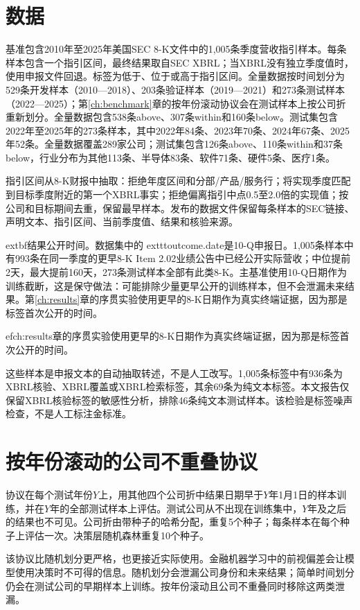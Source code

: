 \documentclass[12pt,openany]{ctexbook}
\begin{document}
\section{数据}
基准包含2010年至2025年美国SEC 8-K文件中的1,005条季度营收指引样本。每条样本包含一个指引区间，最终结果取自SEC XBRL；当XBRL没有独立季度值时，使用申报文件回退。标签为低于、位于或高于指引区间。全量数据按时间划分为529条开发样本（2010—2018）、203条验证样本（2019—2021）和273条测试样本（2022—2025）；第\ref{ch:benchmark}章的按年份滚动协议会在测试样本上按公司折重新划分。全量数据包含538条above、307条within和160条below。测试集包含2022年至2025年的273条样本，其中2022年84条、2023年70条、2024年67条、2025年52条。全量数据覆盖289家公司；测试集包含126条above、110条within和37条below，行业分布为其他113条、半导体83条、软件71条、硬件5条、医疗1条。\par
指引区间从8-K财报中抽取：拒绝年度区间和分部/产品/服务行；将实现季度匹配到目标季度附近的第一个XBRL事实；拒绝偏离指引中点0.5至2.0倍的实现值；按公司和目标期间去重，保留最早样本。发布的数据文件保留每条样本的SEC链接、声明文本、指引区间、当前季度值、结果和核验来源。\par
	extbf{结果公开时间。}数据集中的	exttt{outcome.date}是10-Q申报日。1,005条样本中有993条在同一季度的更早8-K Item 2.02业绩公告中已经公开实际营收；中位提前2天，最大提前160天，273条测试样本全部有此类8-K。主基准使用10-Q日期作为训练截断，这是保守做法：可能排除少量更早公开的训练样本，但不会泄漏未来结果。第\ref{ch:results}章的序贯实验使用更早的8-K日期作为真实终端证据，因为那是标签首次公开的时间。\par
ef{ch:results}章的序贯实验使用更早的8-K日期作为真实终端证据，因为那是标签首次公开的时间。\par
这些样本是申报文本的自动抽取转述，不是人工改写。1,005条标签中有936条为XBRL核验、XBRL覆盖或XBRL检索标签，其余69条为纯文本标签。本文报告仅保留XBRL核验标签的敏感性分析，排除46条纯文本测试样本。该检验是标签噪声检查，不是人工标注金标准。\par

\section{按年份滚动的公司不重叠协议}
协议在每个测试年份$Y$上，用其他四个公司折中结果日期早于$Y$年1月1日的样本训练，并在$Y$年的全部测试样本上评估。测试公司从不出现在训练集中，$Y$年及之后的结果也不可见。公司折由带种子的哈希分配，重复5个种子；每条样本在每个种子上评估一次。决策层随机森林重复10个种子。\par
该协议比随机划分更严格，也更接近实际使用。金融机器学习中的前视偏差会让模型使用决策时不可得的信息\cite{lopezdeprado2018advances}。随机划分会泄漏公司身份和未来结果；简单时间划分仍会在测试公司的早期样本上训练。按年份滚动且公司不重叠同时移除这两类泄漏。\par
\end{document}
